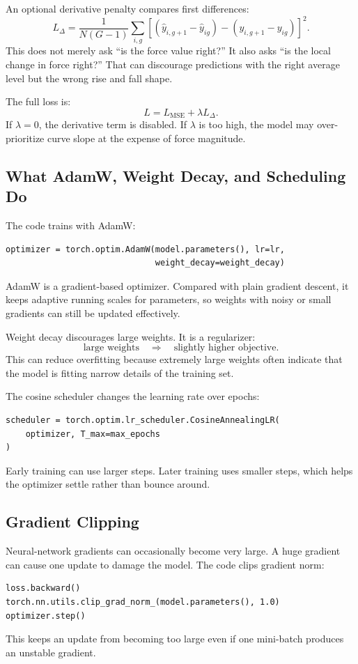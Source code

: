 \documentclass[11pt]{article}
\begin{document}
An optional derivative penalty compares first differences:
\[
  L_{\Delta}
  =
  \frac{1}{N(G-1)}
  \sum_{i,g}
  \left[
  (\hat{y}_{i,g+1}-\hat{y}_{ig})
  -
  (y_{i,g+1}-y_{ig})
  \right]^2.
\]
This does not merely ask ``is the force value right?'' It also asks ``is the
local change in force right?'' That can discourage predictions with the right
average level but the wrong rise and fall shape.

The full loss is:
\[
  L = L_{\text{MSE}} + \lambda L_{\Delta}.
\]
If \(\lambda=0\), the derivative term is disabled. If \(\lambda\) is too high,
the model may over-prioritize curve slope at the expense of force magnitude.

\subsection{What AdamW, Weight Decay, and Scheduling Do}

The code trains with AdamW:
\begin{lstlisting}
optimizer = torch.optim.AdamW(model.parameters(), lr=lr,
                              weight_decay=weight_decay)
\end{lstlisting}
AdamW is a gradient-based optimizer. Compared with plain gradient descent, it
keeps adaptive running scales for parameters, so weights with noisy or small
gradients can still be updated effectively.

Weight decay discourages large weights. It is a regularizer:
\[
  \text{large weights} \quad \Rightarrow \quad \text{slightly higher objective}.
\]
This can reduce overfitting because extremely large weights often indicate that
the model is fitting narrow details of the training set.

The cosine scheduler changes the learning rate over epochs:
\begin{lstlisting}
scheduler = torch.optim.lr_scheduler.CosineAnnealingLR(
    optimizer, T_max=max_epochs
)
\end{lstlisting}
Early training can use larger steps. Later training uses smaller steps, which
helps the optimizer settle rather than bounce around.

\subsection{Gradient Clipping}

Neural-network gradients can occasionally become very large. A huge gradient
can cause one update to damage the model. The code clips gradient norm:
\begin{lstlisting}
loss.backward()
torch.nn.utils.clip_grad_norm_(model.parameters(), 1.0)
optimizer.step()
\end{lstlisting}
This keeps an update from becoming too large even if one mini-batch produces an
unstable gradient.
\end{document}
